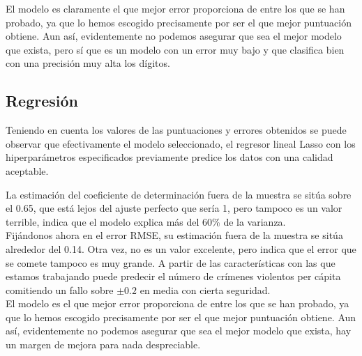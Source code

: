 \documentclass[12pt]{article}
\begin{document}
El modelo es claramente el que mejor error proporciona de entre los que se han probado, ya que lo hemos escogido precisamente por ser el que mejor puntuación obtiene. Aun así, evidentemente no podemos asegurar que sea el mejor modelo que exista, pero sí que es un modelo con un error muy bajo y que clasifica bien con una precisión muy alta los dígitos. 

\subsection{Regresión}

Teniendo en cuenta los valores de las puntuaciones y errores obtenidos se puede observar que efectivamente el modelo seleccionado, el regresor lineal Lasso con los hiperparámetros especificados previamente predice los datos con una calidad aceptable. 

La estimación del coeficiente de determinación fuera de la muestra se sitúa sobre el 0.65, que está lejos del ajuste perfecto que sería 1, pero tampoco es un valor terrible, indica que el modelo explica más del 60\% de la varianza.\\

Fijándonos ahora en el error RMSE, su estimación fuera de la muestra se sitúa alrededor del 0.14. Otra vez, no es un valor excelente, pero indica que el error que se comete tampoco es muy grande. A partir de las características con las que estamos trabajando puede predecir el número de crímenes violentos per cápita comitiendo un fallo sobre $\pm 0.2$ en media con cierta seguridad.\\

El modelo es el que mejor error proporciona de entre los que se han probado, ya que lo hemos escogido precisamente por ser el que mejor puntuación obtiene. Aun así, evidentemente no podemos asegurar que sea el mejor modelo que exista, hay un margen de mejora para nada despreciable.
\end{document}
